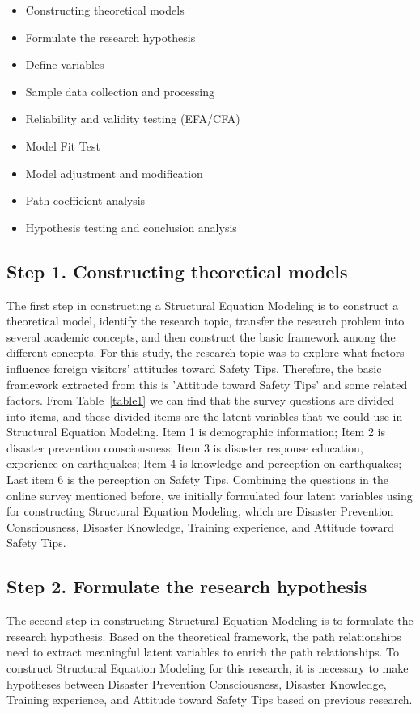 \begin{itemize}
\item Constructing theoretical models
\item Formulate the research hypothesis
\item Define variables
\item Sample data collection and processing
\item Reliability and validity testing (EFA/CFA)
\item Model Fit Test
\item Model adjustment and modification
\item Path coefficient analysis
\item Hypothesis testing and conclusion analysis
\end{itemize}

\subsection{Step 1. Constructing theoretical models}
The first step in constructing a Structural Equation Modeling is to construct a theoretical model, identify the research topic, transfer the research problem into several academic concepts, and then construct the basic framework among the different concepts. For this study, the research topic was to explore what factors influence foreign visitors' attitudes toward Safety Tips. Therefore, the basic framework extracted from this is 'Attitude toward Safety Tips' and some related factors. From Table~\ref{table1} we can find that the survey questions are divided into items, and these divided items are the latent variables that we could use in Structural Equation Modeling. Item 1 is demographic information; Item 2 is disaster prevention consciousness; Item 3 is disaster response education, experience on earthquakes; Item 4 is knowledge and perception on earthquakes; Last item 6 is the perception on Safety Tips. Combining the questions in the online survey mentioned before, we initially formulated four latent variables using for constructing Structural Equation Modeling, which are Disaster Prevention Consciousness, Disaster Knowledge, Training experience, and Attitude toward Safety Tips.

\subsection{Step 2. Formulate the research hypothesis}
The second step in constructing Structural Equation Modeling is to formulate the research hypothesis. Based on the theoretical framework, the path relationships need to extract meaningful latent variables to enrich the path relationships. To construct Structural Equation Modeling for this research, it is necessary to make hypotheses between Disaster Prevention Consciousness, Disaster Knowledge, Training experience, and Attitude toward Safety Tips based on previous research. 


